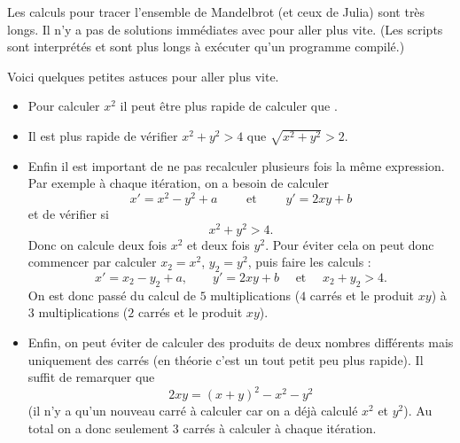 \documentclass[11pt,class=report,crop=false]{standalone}
\begin{document}

\begin{cours}
Les calculs pour tracer l'ensemble de Mandelbrot (et ceux de Julia) sont très longs.
Il n'y a pas de solutions immédiates avec \Python{} pour aller plus vite. (Les scripts \Python{} sont interprétés et sont plus longs à exécuter qu'un programme compilé.) 

Voici quelques petites astuces pour aller plus vite.
\begin{itemize}
  \item Pour calculer $x^2$ il peut être plus rapide de calculer  que .
  
  \item Il est plus rapide de vérifier $x^2+y^2 > 4$ que $\sqrt{x^2+y^2}>2$.
  
  \item Enfin il est important de ne pas recalculer plusieurs fois la même expression.
  Par exemple à chaque itération, on a besoin de calculer
 $$x' = x^2 - y^2 + a \qquad \text{ et } \qquad y' = 2 x y +  b $$ 
 et de vérifier si 
 $$x^2+y^2 > 4.$$
 Donc on calcule deux fois $x^2$ et deux fois $y^2$.
 Pour éviter cela on peut donc commencer par calculer $x_2= x^2$, $y_2 = y^2$, puis faire les calculs :
  $$x' = x_2 - y_2 + a, \qquad y' = 2 x y +  b \quad \text{ et } \quad x_2+y_2 > 4.$$
  On est donc passé du calcul de $5$ multiplications ($4$ carrés et le produit $xy$) à $3$ multiplications ($2$ carrés et le produit $xy$).
  
  \item Enfin, on peut éviter de calculer des produits de deux nombres différents mais
  uniquement des carrés (en théorie c'est un tout petit peu plus rapide). Il suffit de  remarquer que 
  $$2xy = (x+y)^2 - x^2 - y^2$$
  (il n'y a qu'un nouveau carré à calculer car on a déjà calculé $x^2$ et $y^2$).
  Au total on a donc seulement $3$ carrés à calculer à chaque itération.
\end{itemize}
\end{cours}
\end{document}
